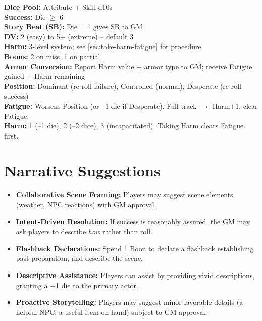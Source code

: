 \begin{tcolorbox}[colback=blue!5!white,colframe=blue!75!black,title=\textbf{Quick Reference},fonttitle=\bfseries,breakable]
\textbf{Dice Pool:} Attribute + Skill d10s \\
\textbf{Success:} Die $\geq$ 6 \\
\textbf{Story Beat (SB):} Die = 1 gives SB to GM \\
\textbf{DV:} 2 (easy) to 5+ (extreme) -- default 3 \\
\textbf{Harm:} 3-level system; see \ref{sec:take-harm-fatigue} for procedure \\
\textbf{Boons:} 2 on miss, 1 on partial \\
\textbf{Armor Conversion:} Report Harm value + armor type to GM; receive Fatigue gained + Harm remaining \\
\textbf{Position:} Dominant (re-roll failure), Controlled (normal), Desperate (re-roll success) \\
\textbf{Fatigue:} Worsens Position (or --1 die if Desperate). Full track $\rightarrow$ Harm+1, clear Fatigue. \\
\textbf{Harm:} 1 (--1 die), 2 (--2 dice), 3 (incapacitated). Taking Harm clears Fatigue first. \\
\end{tcolorbox}

\section{Narrative Suggestions}
\label{sec:narrative-suggestions}

\begin{itemize}
  \item \textbf{Collaborative Scene Framing:} Players may suggest scene elements (weather, NPC reactions) with GM approval.
  \item \textbf{Intent-Driven Resolution:} If success is reasonably assured, the GM may ask players to describe \textit{how} rather than roll.
  \item \textbf{Flashback Declarations:} Spend 1 Boon to declare a flashback establishing past preparation, and describe the scene.
  \item \textbf{Descriptive Assistance:} Players can assist by providing vivid descriptions, granting a +1 die to the primary actor.
  \item \textbf{Proactive Storytelling:} Players may suggest minor favorable details (a helpful NPC, a useful item on hand) subject to GM approval.
\end{itemize}

